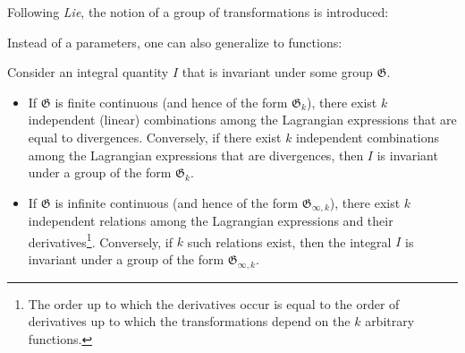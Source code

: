     Following \textit{Lie}, the notion of a group of transformations is introduced:

    Instead of a parameters, one can also generalize to functions:

    \begin{theorem}[Noether]\label{var:noether}
        Consider an integral quantity $I$ that is invariant under some group $\mathfrak{G}$.
        \begin{itemize}
            \item If $\mathfrak{G}$ is finite continuous (and hence of the form $\mathfrak{G}_k$), there exist $k$ independent (linear) combinations among the Lagrangian expressions that are equal to divergences. Conversely, if there exist $k$ independent combinations among the Lagrangian expressions that are divergences, then $I$ is invariant under a group of the form $\mathfrak{G}_k$.
            \item If $\mathfrak{G}$ is infinite continuous (and hence of the form $\mathfrak{G}_{\infty,k}$), there exist $k$ independent relations among the Lagrangian expressions and their derivatives\footnote{The order up to which the derivatives occur is equal to the order of derivatives up to which the transformations depend on the $k$ arbitrary functions.}. Conversely, if $k$ such relations exist, then the integral $I$ is invariant under a group of the form $\mathfrak{G}_{\infty,k}$.
        \end{itemize}
    \end{theorem}

